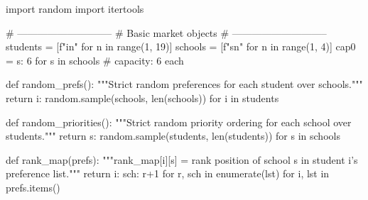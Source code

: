 import random
import itertools

# -----------------------------
# Basic market objects
# -----------------------------
students = [f"i{n}" for n in range(1, 19)]
schools  = [f"s{n}" for n in range(1, 4)]
cap0     = {s: 6 for s in schools}  # capacity: 6 each

def random_prefs():
    """Strict random preferences for each student over schools."""
    return {i: random.sample(schools, len(schools)) for i in students}

def random_priorities():
    """Strict random priority ordering for each school over students."""
    return {s: random.sample(students, len(students)) for s in schools}

def rank_map(prefs):
    """rank_map[i][s] = rank position of school s in student i's preference list."""
    return {i: {sch: r+1 for r, sch in enumerate(lst)} for i, lst in prefs.items()}

